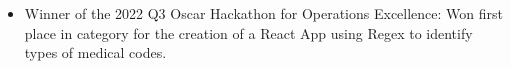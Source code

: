 \documentclass[a4paper]{article}
\begin{document}
\begin{itemize}[leftmargin=10pt,align=left]
    \vspace{-1.5mm} \item
        Winner of the 2022 Q3 Oscar Hackathon for Operations Excellence: Won first place in category for the creation of a React App using Regex to identify types of medical codes.

\end{itemize}
\end{document}
